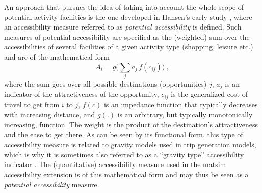 An approach that pursues the idea of taking into account the whole scope of potential activity facilities is the one 
developed in Hansen's early study \citep{Hansen1959HowAccessibilityShapesLandUse}, where an accessibility 
measure referred to as \textit{potential accessibility} is defined. Such measures of potential accessibility are 
specified as the (weighted) sum over the 
accessibilities of several facilities of a given activity type (\eg shopping, leisure etc.) and are of the mathematical form
\begin{equation}
	A_i = g\Big( \sum_j a_j \, f(c_{ij}) \Big) \ ,
	\label{eq:accessibility:basic}
\end{equation}
where the sum goes over all possible destinations (opportunities) $j$, $a_j$ is an indicator of the attractiveness of 
the opportunity, $c_{ij}$ is the generalized cost of travel to get from $i$ to $j$, $f(c)$ is an impedance function that 
typically decreases with increasing distance, and $g(.)$ is an arbitrary, but typically monotonically increasing, function. 
The weight is the product of the destination's attractiveness and the ease to get there. As can be seen by its functional form, 
this type of accessibility measure is related to gravity models used in trip generation models, which is why it is sometimes also
referred to as a “gravity type” accessibility indicator \citep{MorrisEtAl1978AccessibilityIndicators}.
The (quantitative) accessibility measure used in the \gls{matsim} accessibility extension is of this mathematical form
and may thus be seen as a \textit{potential accessibility} measure.



